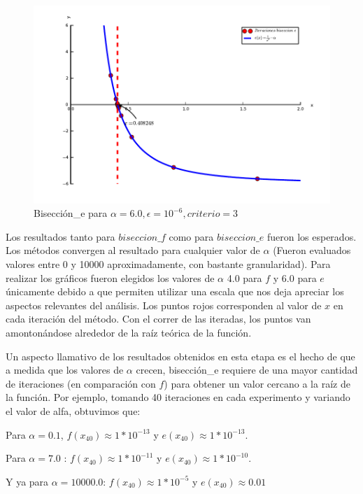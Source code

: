 \begin{figure}[!h]
	\begin{center}
		  \includegraphics[keepaspectratio]{../Imagenes/exp1/biseccion_e.pdf}
		  \caption{Bisección\_e para $\alpha=6.0, \epsilon = 10^{-6}, criterio = 3$}
		  \label{fig:contra1}
	\end{center}
\end{figure}
\FloatBarrier
Los resultados tanto para $biseccion\_f$ como para $biseccion\_e$ fueron los esperados. Los métodos convergen al resultado para cualquier valor de $\alpha$ (Fueron evaluados valores entre 0 y 10000 aproximadamente,
con bastante granularidad). Para realizar los gráficos fueron elegidos los valores de $\alpha$ 4.0 para $f$ y 6.0 para $e$ únicamente debido a que permiten utilizar una escala que nos deja apreciar los aspectos
relevantes del análisis. Los puntos rojos corresponden al valor de $x$ en cada iteración del método. Con el correr de las iteradas, los puntos van amontonándose alrededor de la raíz teórica de la función.

Un aspecto llamativo de los resultados obtenidos en esta etapa es el hecho de que 
a medida que los valores de $\alpha$ crecen, bisección\_e requiere de una mayor cantidad de iteraciones (en comparación con $f$) para obtener un valor cercano a la raíz de la función. Por ejemplo,
tomando 40 iteraciones en cada experimento y variando el valor de alfa, obtuvimos que: 

Para $\alpha = 0.1$, $f(x_{40}) \approx 1*10^{-13}$ y $e(x_{40}) \approx 1*10^{-13}$. 

Para $\alpha = 7.0$ : 
$f(x_{40}) \approx 1*10^{-11}$ y $e(x_{40}) \approx 1*10^{-10}$. 

Y ya para $\alpha = 10000.0$: $f(x_{40}) \approx 1*10^{-5}$ y $e(x_{40}) \approx 0.01$

